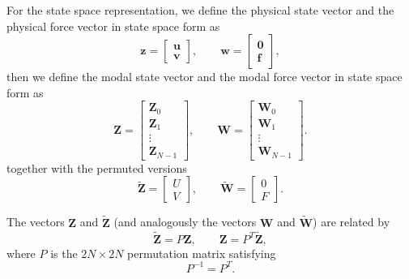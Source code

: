 \documentclass{Configuration_Files/PoliMi3i_thesis}
\begin{document}
For the state space representation, we define the physical state vector and the physical force vector in state space form as
\begin{equation*}
\mathbf z
=
\begin{bmatrix}
\mathbf u\\
\mathbf v
\end{bmatrix},
\qquad
\mathbf w
=
\begin{bmatrix}
\mathbf 0\\
\mathbf f
\end{bmatrix},
\end{equation*}
then we define the modal state vector and the modal force vector in state space form as
\begin{equation*}
\mathbf Z
=
\begin{bmatrix}
\mathbf Z_0\\
\mathbf Z_1\\
\vdots\\
\mathbf Z_{N-1}
\end{bmatrix},
\qquad
\mathbf W
=
\begin{bmatrix}
\mathbf W_0\\
\mathbf W_1\\
\vdots\\
\mathbf W_{N-1}
\end{bmatrix}.
\end{equation*}
together with the permuted versions
\begin{equation*}
\widetilde{\mathbf Z}
=
\begin{bmatrix}
U\\
V
\end{bmatrix},
\qquad
\widetilde{\mathbf W}
=
\begin{bmatrix}
0\\
F
\end{bmatrix}.
\end{equation*}

The vectors $\mathbf Z$ and $\widetilde{\mathbf Z}$ (and analogously the vectors $\mathbf W$ and $\widetilde{\mathbf W}$) are related by
\begin{equation*}
\widetilde{\mathbf Z}
=
P\mathbf Z,
\qquad
\mathbf Z
=
P^T\widetilde{\mathbf Z},
\end{equation*}
where $P$ is the $2N\times2N$ permutation matrix satisfying
\begin{equation*}
P^{-1}
=
P^T.
\end{equation*}
\end{document}
